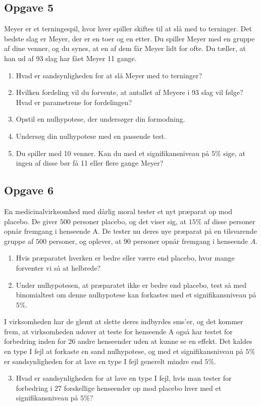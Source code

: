 \subsection*{Opgave 5}
Meyer er et terningespil, hvor hver spiller skiftes til at slå med to terninger. Det bedste slag er Meyer, der er en toer og en etter. Du spiller Meyer med en gruppe af dine venner, og du synes, at en af dem får Meyer lidt for ofte. Du tæller, at han ud af 93 slag har fået Meyer 11 gange.
\begin{enumerate}[label=\roman*)]
\item Hvad er sandsynligheden for at slå Meyer med to terninger?
\item Hvilken fordeling vil du forvente, at antallet af Meyere i 93 slag vil følge? Hvad er parametrene for fordelingen?
\item Opstil en nulhypotese, der undersøger din formodning.
\item Undersøg din nulhypotese med en passende test. 
\item Du spiller med 10 venner. Kan du med et signifikansniveau på $5\%$ sige, at ingen af disse bør få 11 eller flere gange Meyer?
\end{enumerate}

\subsection*{Opgave 6}
En medicinalvirksomhed med dårlig moral tester et nyt præparat op mod placebo. De giver $500$ personer placebo, og det viser sig, at $15\%$ af disse personer opnår fremgang i henseende A. De tester nu deres nye præparat på en tilsvarende gruppe af $500$ personer, og oplever, at $90$ personer opnår fremgang i henseende $A$. 
\begin{enumerate}[label=\roman*)]
\item Hvis præparatet hverken er bedre eller værre end placebo, hvor mange forventer vi så at helbrede?
\item Under nulhypotesen, at præparatet ikke er bedre end placebo, test så med binomialtest om denne nulhypotese kan forkastes med et signifikansniveau på $5\%$.
\end{enumerate}
I virksomheden har de glemt at slette deres indbyrdes sms'er, og det kommer frem, at virksomheden udover at teste for henseende A også har testet for forbedring inden for 26 andre henseender uden at kunne se en effekt. Det kaldes en type I fejl at forkaste en sand nulhypotese, og med et signifikansniveau på $5\%$ er sandsynligheden for at lave en type I fejl generelt mindre end $5\%$. 
\begin{enumerate}[label=\roman*)]
\setcounter{enumi}{2}
\item Hvad er sandsynligheden for at lave en type I fejl, hvis man tester for forbedring i 27 forskellige henseender op mod placebo hver med et signifikansniveau på $5\%$?

\end{enumerate}